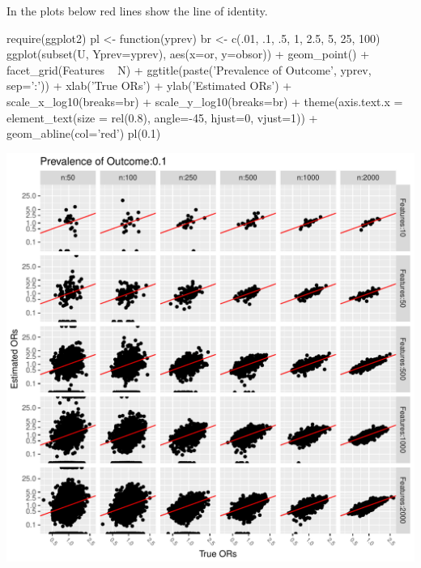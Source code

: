 In the plots below red lines show the line of identity.

\begin{Schunk}
\begin{Sinput}
require(ggplot2)
pl <- function(yprev) {
  br <- c(.01, .1, .5, 1, 2.5, 5, 25, 100)
  ggplot(subset(U, Yprev=yprev),
         aes(x=or, y=obsor)) + geom_point() + facet_grid(Features ~ N) +
         ggtitle(paste('Prevalence of Outcome', yprev, sep=':')) +
         xlab('True ORs') + ylab('Estimated ORs') +
         scale_x_log10(breaks=br) + scale_y_log10(breaks=br) +
         theme(axis.text.x = element_text(size = rel(0.8), angle=-45,
                                    hjust=0, vjust=1)) +
         geom_abline(col='red')
}
pl(0.1)
\end{Sinput}


\centerline{\includegraphics{hdata-simor-plot-1} }

\end{Schunk}

